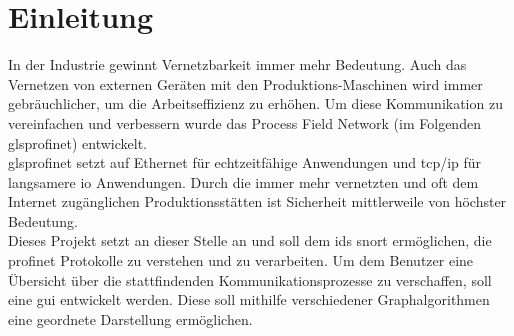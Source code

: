 \chapter*{Einleitung}

In der Industrie gewinnt Vernetzbarkeit immer mehr Bedeutung. Auch das Vernetzen von externen Geräten mit den Produktions-Maschinen wird immer gebräuchlicher, um die Arbeitseffizienz zu erhöhen. Um diese Kommunikation zu vereinfachen und verbessern wurde das Process Field Network (im Folgenden gls{profinet}) entwickelt.\\
gls{profinet} setzt auf Ethernet für echtzeitfähige Anwendungen und \gls{tcp}/\gls{ip} für langsamere \gls{io} Anwendungen. Durch die immer mehr vernetzten und oft dem Internet zugänglichen Produktionsstätten ist Sicherheit mittlerweile von höchster Bedeutung. \\
Dieses Projekt setzt an dieser Stelle an und soll dem \gls{ids} \gls{snort} ermöglichen, die \gls{profinet} Protokolle zu verstehen und zu verarbeiten. Um dem Benutzer eine Übersicht über die stattfindenden Kommunikationsprozesse zu verschaffen, soll eine \gls{gui} entwickelt werden. Diese soll mithilfe verschiedener Graphalgorithmen eine geordnete Darstellung ermöglichen. 
